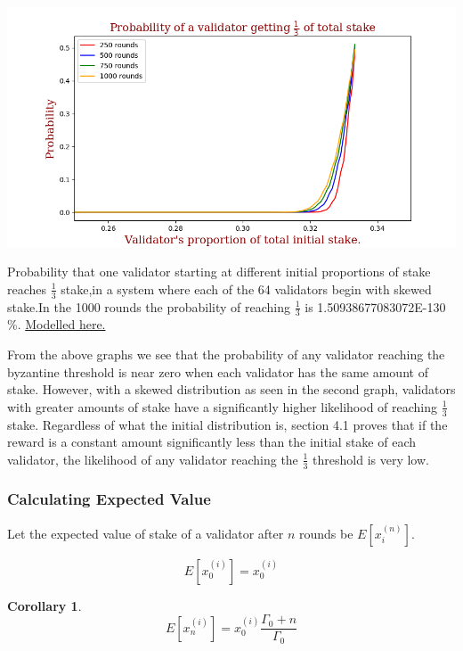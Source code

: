 \documentclass{article}
\newtheorem{corollary}{Corollary}[theorem]
\renewcommand{\|}{\;|\;}
\begin{document}
\begin{center}
\includegraphics[scale=0.6]{images/Cons_reward_probability_non_log.png}\newline\caption{Probability that one validator starting at different initial proportions of stake reaches $\frac{1}{3}$ stake,in a system where each of the 64 validators begin with skewed stake.In the 1000 rounds the probability of reaching $\frac{1}{3}$ is 1.50938677083072E-130  \%. \href{https://github.com/aparnakr/pos-analysis}{Modelled here.}}
\end{center}
From the above graphs we see that the probability of any validator reaching the byzantine threshold is near zero when each validator has the same amount of stake. However, with a skewed distribution as seen in the second graph, validators with greater amounts of stake have a significantly higher likelihood of reaching $\frac{1}{3}$ stake.
\newline \newline 
Regardless of what the initial distribution is, section 4.1 proves that if the reward is a constant amount significantly less than the initial stake of each validator, the likelihood of any validator reaching the $\frac{1}{3}$ threshold is very low. 



\subsubsection{Calculating Expected Value}
Let the expected value of stake of a validator after $n$ rounds be $E[x_i^{(n)}]$.

$$E[x_0^{(i)}]= x_0^{(i)}$$

\begin{corollary} $$E[x_n^{(i)}] = x_0^{(i)}\frac{\Gamma_0 + n}{\Gamma_0}$$
\end{corollary}
\end{document}

